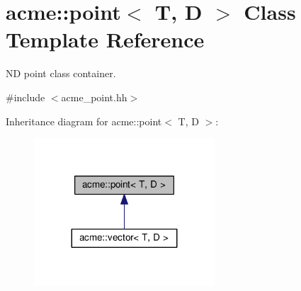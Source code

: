 \hypertarget{classacme_1_1point}{}\section{acme\+:\+:point$<$ T, D $>$ Class Template Reference}
\label{classacme_1_1point}


ND point class container.  




{\ttfamily \#include $<$acme\+\_\+point.\+hh$>$}



Inheritance diagram for acme\+:\+:point$<$ T, D $>$\+:\nopagebreak
\begin{figure}[H]
\begin{center}
\leavevmode
\includegraphics[width=191pt]{de/d84/classacme_1_1point__inherit__graph}
\end{center}
\end{figure}
